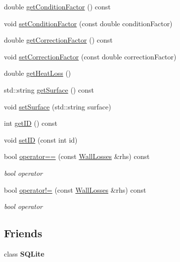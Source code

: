 \begin{DoxyCompactItemize}
\item 
double \hyperlink{class_wall_losses_a16ab4003a17f9e95f28b9390b92c2b27}{get\+Condition\+Factor} () const
\item 
void \hyperlink{class_wall_losses_a1533a7513460d22f433fb670700573a2}{set\+Condition\+Factor} (const double condition\+Factor)
\item 
double \hyperlink{class_wall_losses_a4ce6a0ec36cd868b14b041f18251cb6d}{get\+Correction\+Factor} () const
\item 
void \hyperlink{class_wall_losses_affdf3f6c3d54d73c7f91e1515fb12533}{set\+Correction\+Factor} (const double correction\+Factor)
\item 
double \hyperlink{class_wall_losses_a884da3507498878f619cbe5ba340c0ef}{get\+Heat\+Loss} ()
\item 
std\+::string \hyperlink{class_wall_losses_a10f5de20dc6fead726adbf62a9c49b09}{get\+Surface} () const
\item 
void \hyperlink{class_wall_losses_af329a27b78e1f2d84af6a48ffc59bfad}{set\+Surface} (std\+::string surface)
\item 
int \hyperlink{class_wall_losses_ae764fa8917879d8c24df7582c159fec6}{get\+ID} () const
\item 
void \hyperlink{class_wall_losses_a3a135d9bfd6c6f1c4742031ab568b26d}{set\+ID} (const int id)
\item 
\mbox{\label{class_wall_losses_ad9eebb34927690332c00df51507878e9}} 
bool \hyperlink{class_wall_losses_ad9eebb34927690332c00df51507878e9}{operator==} (const \hyperlink{class_wall_losses}{Wall\+Losses} \&rhs) const
\begin{DoxyCompactList}\small\item\em bool operator \end{DoxyCompactList}\item 
\mbox{\label{class_wall_losses_a46d50205e67870978292c4bfa1c9d329}} 
bool \hyperlink{class_wall_losses_a46d50205e67870978292c4bfa1c9d329}{operator!=} (const \hyperlink{class_wall_losses}{Wall\+Losses} \&rhs) const
\begin{DoxyCompactList}\small\item\em bool operator \end{DoxyCompactList}\end{DoxyCompactItemize}
\subsection*{Friends}
\begin{DoxyCompactItemize}
\item 
\mbox{\label{class_wall_losses_ac7d22f3ca36435f73d55df60dc799e14}} 
class {\bfseries S\+Q\+Lite}
\end{DoxyCompactItemize}


